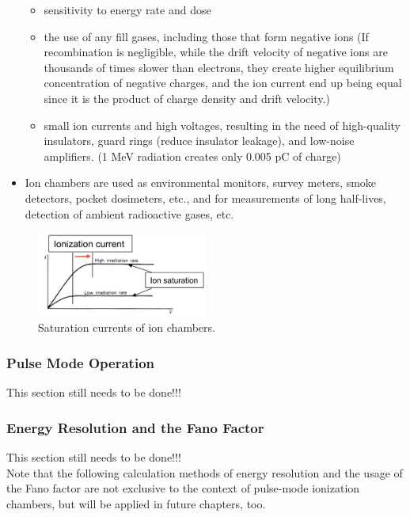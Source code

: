 \begin{itemize}
    \begin{itemize}
        \item sensitivity to energy rate and dose
        \item the use of any fill gases, including those that form negative ions (If recombination is negligible, while the drift velocity of negative ions are thousands of times slower than electrons, they create higher equilibrium concentration of negative charges, and the ion current end up being equal since it is the product of charge density and drift velocity.)
        \item small ion currents and high voltages, resulting in the need of high-quality insulators, guard rings (reduce insulator leakage), and low-noise amplifiers. (1 MeV radiation creates only 0.005 pC of charge)
    \end{itemize}
    \item Ion chambers are used as environmental monitors, survey meters, smoke detectors,  pocket dosimeters, etc., and for measurements of long half-lives, detection of ambient radioactive gases, etc. 
\end{itemize}
\begin{figure}[ht]
    \centering
    \includegraphics[width=0.5\textwidth]{images/ion_chamber_saturation_current.png}
    \caption{Saturation currents of ion chambers.}
    \label{fig:ion_chamber_saturation_current}
\end{figure}
\subsubsection{Pulse Mode Operation}
{\color{red} This section still needs to be done!!!}
\subsubsection{Energy Resolution and the Fano Factor}
{\color{red} This section still needs to be done!!!}\\
Note that the following calculation methods of energy resolution and the usage of the Fano factor are not exclusive to the context of pulse-mode ionization chambers, but will be applied in future chapters, too. 
